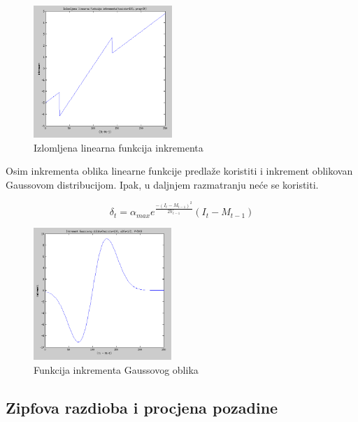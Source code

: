 \documentclass[a4paper,twocolumn]{article}
\begin{document}
\begin{figure}[htb]
\begin{center}
\includegraphics[height=5cm]{afina2.png}
\caption{Izlomljena linearna funkcija inkrementa}
\end{center}
\end{figure}

Osim inkrementa oblika linearne funkcije \cite{zipf} predlaže koristiti i
inkrement oblikovan Gaussovom distribucijom. Ipak, u daljnjem razmatranju neće
se koristiti.

\begin{equation}
\delta_t = \alpha_{max} e^{\frac{-(I_t - M_{t-1})^2}{2V_{t-1}}}(I_t - M_{t-1})
\end{equation}

\begin{figure}[htb]
\begin{center}
\includegraphics[height=5cm]{gauss.png}
\caption{Funkcija inkrementa Gaussovog oblika}
\end{center}
\end{figure}


\subsection{Zipfova razdioba i procjena pozadine}
\end{document}
